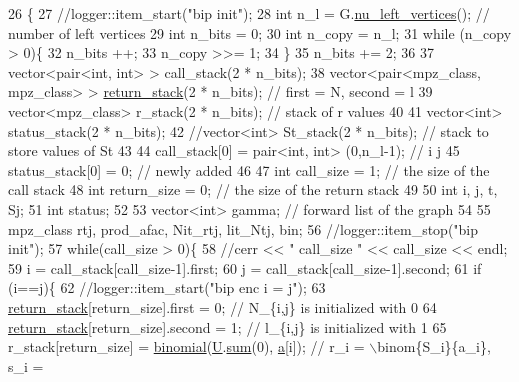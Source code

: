 \begin{DoxyCode}
26                                                                      \{
27   \textcolor{comment}{//logger::item\_start("bip init");}
28   \textcolor{keywordtype}{int} n\_l = G.\hyperlink{classb__graph_a5e71d5c97f2501b0b93c17146cf7e68e}{nu\_left\_vertices}(); \textcolor{comment}{// number of left vertices}
29   \textcolor{keywordtype}{int} n\_bits = 0;
30   \textcolor{keywordtype}{int} n\_copy = n\_l;
31   \textcolor{keywordflow}{while} (n\_copy > 0)\{
32     n\_bits ++;
33     n\_copy >>= 1;
34   \}
35   n\_bits += 2;
36 
37   vector<pair<int, int> > call\_stack(2 * n\_bits);
38   vector<pair<mpz\_class, mpz\_class> > \hyperlink{namespacehelper__vars_a6d2100c373830cacd232319a9958652d}{return\_stack}(2 * n\_bits); \textcolor{comment}{// first = N, second = l}
39   vector<mpz\_class> r\_stack(2 * n\_bits); \textcolor{comment}{// stack of r values}
40 
41   vector<int> status\_stack(2 * n\_bits);
42   \textcolor{comment}{//vector<int> St\_stack(2 * n\_bits); // stack to store values of St}
43  
44   call\_stack[0] = pair<int, int> (0,n\_l-1); \textcolor{comment}{// i j }
45   status\_stack[0] = 0; \textcolor{comment}{// newly added}
46  
47   \textcolor{keywordtype}{int} call\_size = 1; \textcolor{comment}{// the size of the call stack}
48   \textcolor{keywordtype}{int} return\_size = 0; \textcolor{comment}{// the size of the return stack}
49 
50   \textcolor{keywordtype}{int} i, j, t, Sj;
51   \textcolor{keywordtype}{int} status;
52  
53   vector<int> gamma; \textcolor{comment}{// forward list  of the graph}
54 
55   mpz\_class rtj, prod\_afac, Nit\_rtj, lit\_Ntj, bin;
56   \textcolor{comment}{//logger::item\_stop("bip init");}
57   \textcolor{keywordflow}{while}(call\_size > 0)\{
58     \textcolor{comment}{//cerr << " call\_size " << call\_size << endl;}
59     i = call\_stack[call\_size-1].first;
60     j = call\_stack[call\_size-1].second;
61     \textcolor{keywordflow}{if} (i==j)\{
62       \textcolor{comment}{//logger::item\_start("bip enc i = j");}
63       \hyperlink{namespacehelper__vars_a6d2100c373830cacd232319a9958652d}{return\_stack}[return\_size].first = 0; \textcolor{comment}{// N\_\{i,j\} is initialized with 0}
64       \hyperlink{namespacehelper__vars_a6d2100c373830cacd232319a9958652d}{return\_stack}[return\_size].second = 1; \textcolor{comment}{// l\_\{i,j\} is initialized with 1}
65       r\_stack[return\_size] = \hyperlink{compression__helper_8cpp_acecca9cb279d3b3d82915a07d67818cf}{binomial}(\hyperlink{classb__graph__encoder_ac810138443002a2b2cf579ced2dc34ce}{U}.\hyperlink{classreverse__fenwick__tree_a672731fd6395b4853430073a099a80e6}{sum}(0), \hyperlink{classb__graph__encoder_afd22d167f495cd85b41397f337c377c2}{a}[i]); \textcolor{comment}{// r\_i = \(\backslash\)binom\{S\_i\}\{a\_i\}, s\_i =
}
\end{DoxyCode}
